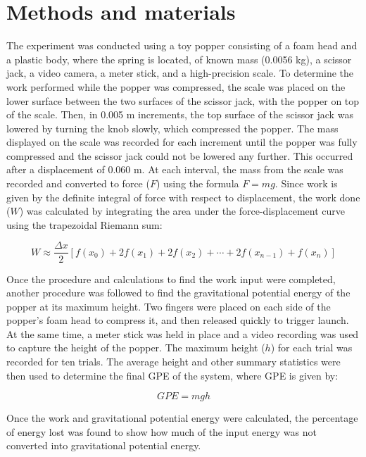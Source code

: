 \documentclass[amsmath,amssymb,aps,endfloats,linenumbers]{revtex4-2}
\begin{document}
\section{Methods and materials}
The experiment was conducted using a toy popper consisting of a foam head and a plastic body, where the spring is located, of known mass (0.0056 kg), a scissor jack, a video camera, a meter stick, and a high-precision scale. To determine the work performed while the popper was compressed, the scale was placed on the lower surface between the two surfaces of the scissor jack, with the popper on top of the scale. Then, in 0.005 m increments, the top surface of the scissor jack was lowered by turning the knob slowly, which compressed the popper. The mass displayed on the scale was recorded for each increment until the popper was fully compressed and the scissor jack could not be lowered any further. This occurred after a displacement of 0.060 m. At each interval, the mass from the scale was recorded and converted to force ($F$) using the formula $F = mg$. Since work is given by the definite integral of force with respect to displacement, the work done ($W$) was calculated by integrating the area under the force-displacement curve using the trapezoidal Riemann sum:

\begin{equation}
W \approx \frac{\Delta x}{2} \left[ f(x_0) + 2f(x_1) + 2f(x_2) + \cdots + 2f(x_{n-1}) + f(x_n) \right]
\end{equation}

Once the procedure and calculations to find the work input were completed, another procedure was followed to find the gravitational potential energy of the popper at its maximum height. Two fingers were placed on each side of the popper's foam head to compress it, and then released quickly to trigger launch. At the same time, a meter stick was held in place and a video recording was used to capture the height of the popper. The maximum height ($h$) for each trial was recorded for ten trials. The average height and other summary statistics were then used to determine the final GPE of the system, where GPE is given by:

\begin{equation}
GPE = mgh
\end{equation}

Once the work and gravitational potential energy were calculated, the percentage of energy lost was found to show how much of the input energy was not converted into gravitational potential energy.
\end{document}
